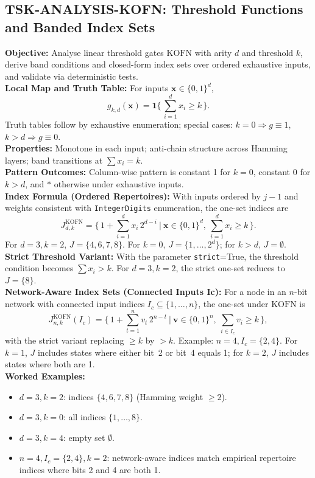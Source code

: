 \documentclass{article}
\begin{document}
\subsection{TSK-ANALYSIS-KOFN: Threshold Functions and Banded Index Sets}
\textbf{Objective:} Analyse linear threshold gates \(\mathrm{KOFN}\) with arity \(d\) and threshold \(k\), derive band conditions and closed-form index sets over ordered exhaustive inputs, and validate via deterministic tests.\\
\textbf{Local Map and Truth Table:} For inputs \(\mathbf{x}\in\{0,1\}^d\),
\[
g_{k,d}(\mathbf{x}) = \mathbf{1}\{\,\sum_{i=1}^{d} x_i \ge k\,\}.
\]
Truth tables follow by exhaustive enumeration; special cases: \(k=0\Rightarrow g\equiv 1\), \(k>d\Rightarrow g\equiv 0\).\\
\textbf{Properties:} Monotone in each input; anti-chain structure across Hamming layers; band transitions at \(\sum x_i = k\).\\
\textbf{Pattern Outcomes:} Column-wise pattern is constant 1 for \(k=0\), constant 0 for \(k>d\), and \(*\) otherwise under exhaustive inputs.\\
\textbf{Index Formula (Ordered Repertoires):} With inputs ordered by \(j-1\) and weights consistent with \texttt{IntegerDigits} enumeration, the one-set indices are
\[
J^{\mathrm{KOFN}}_{d,k} = \Big\{\, 1 + \sum_{i=1}^{d} x_i\,2^{d-i} \ \Big| \ \mathbf{x}\in\{0,1\}^d,\ \sum_{i=1}^{d} x_i \ge k\,\Big\}.
\]
For \(d=3, k=2\), \(J=\{4,6,7,8\}\). For \(k=0\), \(J=\{1,\dots,2^d\}\); for \(k>d\), \(J=\emptyset\).\\
\textbf{Strict Threshold Variant:} With the parameter \texttt{strict}=True, the threshold condition becomes \(\sum x_i > k\). For \(d=3, k=2\), the strict one-set reduces to \(J=\{8\}\).\\
\textbf{Network-Aware Index Sets (Connected Inputs Ic):} For a node in an \(n\)-bit network with connected input indices \(I_c\subseteq\{1,\dots,n\}\), the one-set under \(\mathrm{KOFN}\) is
\[
J^{\mathrm{KOFN}}_{n,k}(I_c) = \Big\{\, 1 + \sum_{t=1}^{n} v_t\,2^{n-t} \ \Big| \ \mathbf{v}\in\{0,1\}^n,\ \sum_{i\in I_c} v_i \ge k\,\Big\},
\]
with the strict variant replacing \(\ge k\) by \(>k\). Example: \(n=4, I_c=\{2,4\}\). For \(k=1\), \(J\) includes states where either bit~2 or bit~4 equals 1; for \(k=2\), \(J\) includes states where both are 1.\\
\textbf{Worked Examples:}
\begin{itemize}
\item \(d=3, k=2\): indices \(\{4,6,7,8\}\) (Hamming weight \(\ge 2\)).
\item \(d=3, k=0\): all indices \(\{1,\dots,8\}\).
\item \(d=3, k=4\): empty set \(\emptyset\).
\item \(n=4, I_c=\{2,4\}, k=2\): network-aware indices match empirical repertoire indices where bits 2 and 4 are both 1.
\end{itemize}
\end{document}
